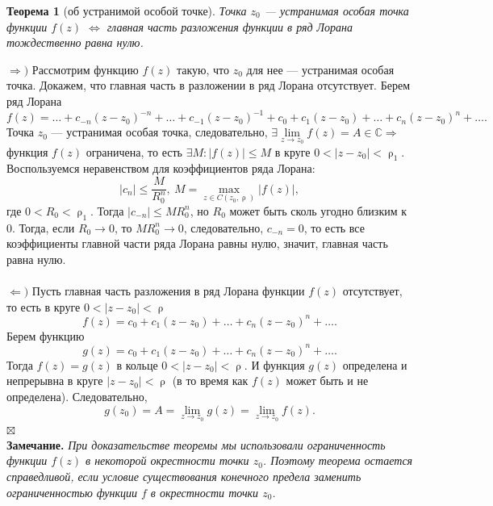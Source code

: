 \documentclass[a4paper, 12pt]{article}
\newenvironment{Proof} %
{\par\noindent{$\blacklozenge$}} %
{\hfill$\scriptstyle\boxtimes$}
\newcommand{\Cm}{\mathbb{C}}
\renewcommand{\leq}{\leqslant}
\renewcommand{\rho}{\uprho}
\newtheorem*{theorem}{Теорема}
\begin{document}
\begin{theorem}
	[об устранимой особой точке] Точка $z_0$ --- устранимая особая точка функции $f(z)$ $\Longleftrightarrow$ главная часть разложения функции в ряд Лорана тождественно равна нулю.
\end{theorem}\begin{Proof}
$\Rightarrow)$ Рассмотрим функцию $f(z)$ такую, что $z_0$ для нее --- устранимая особая точка. Докажем, что главная часть в разложении в ряд Лорана отсутствует. Берем ряд Лорана
$$f(z) = \ldots + c_{-n}(z-z_0)^{-n} + \ldots + c_{-1}(z-z_0)^{-1} + c_0 + c_1(z-z_0) + \ldots + c_n(z-z_0)^n + \ldots.$$
Точка $z_0$ --- устранимая особая точка, следовательно, $\exists \lim\limits_{z\to z_0} f(z) = A\in \Cm\Rightarrow$ функция $f(z)$ ограничена, то есть $\exists M : |f(z)|\leq M$ в круге $0 < |z-z_0| < \rho _1$. Воспользуемся неравенством для коэффициентов ряда Лорана:
$$|c_n|\leq \dfrac{M}{R_0^n},\ M = \underset{z \in C(z_0,\rho)}{\max} |f(z)|,$$
где $0 < R_0 < \rho_1$. Тогда $|c_{-n}| \leq MR_0^n$, но $R_0$ может быть сколь угодно близким к 0. Тогда, если $R_0\to 0$, то $MR_0^n \to 0$, следовательно, $c_{-n} = 0$, то есть все коэффициенты главной части ряда Лорана равны нулю, значит, главная часть равна нулю.\\\\
$\Leftarrow)$ Пусть главная часть разложения в ряд Лорана функции $f(z)$ отсутствует, то есть в круге $0 < |z-z_0|<\rho$ $$f(z) = c_0 + c_1(z-z_0) +\ldots + c_n(z-z_0)^n + \ldots.$$
Берем функцию $$g(z) = c_0 + c_1(z-z_0) +\ldots + c_n(z-z_0)^n + \ldots.$$ Тогда $f(z) = g(z)$ в кольце $0 < |z-z_0|<\rho$. И функция $g(z)$ определена и непрерывна в круге $|z-z_0| < \rho$ (в то время как $f(z)$ может быть и не определена). Следовательно, $$g(z_0) = A = \lim\limits_{z\to z_0} g(z) = \lim\limits_{z\to z_0}f(z).$$
\end{Proof}\\
\textbf{Замечание.} \textit{При доказательстве теоремы мы использовали ограниченность функции $f(z)$ в некоторой окрестности точки $z_0$. Поэтому теорема остается справедливой, если условие существования конечного предела заменить ограниченностью функции $f$ в окрестности точки $z_0$.}
\end{document}
